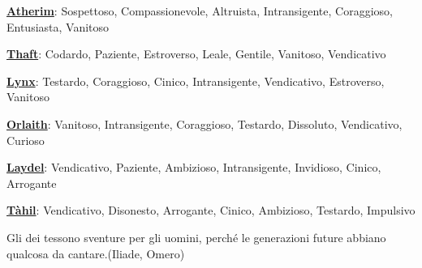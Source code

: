 \begin{multicols}{2}
{\smallskip

\textbf{\hyperlink{atherim}{Atherim}}: Sospettoso, Compassionevole, Altruista, Intransigente, Coraggioso, Entusiasta, Vanitoso\

\smallskip

\textbf{\hyperlink{thaft}{Thaft}}: Codardo, Paziente, Estroverso, Leale, Gentile, Vanitoso, Vendicativo

\smallskip

\textbf{\hyperlink{lynx}{Lynx}}: Testardo, Coraggioso, Cinico, Intransigente, Vendicativo, Estroverso, Vanitoso

\smallskip

\textbf{\hyperlink{orlaith}{Orlaith}}: Vanitoso, Intransigente, Coraggioso, Testardo, Dissoluto, Vendicativo, Curioso

\smallskip

\textbf{\hyperlink{laydel}{Laydel}}: Vendicativo, Paziente, Ambizioso, Intransigente, Invidioso, Cinico, Arrogante

\smallskip

\textbf{\hyperlink{tahil}{Tàhil}}: Vendicativo, Disonesto, Arrogante, Cinico, Ambizioso, Testardo, Impulsivo

}

\end{multicols}

\vfill

\begin{enfasi}
	Gli dei tessono sventure per gli uomini, perché le generazioni future abbiano qualcosa da cantare.(Iliade, Omero)
\end{enfasi}




\pagebreak
